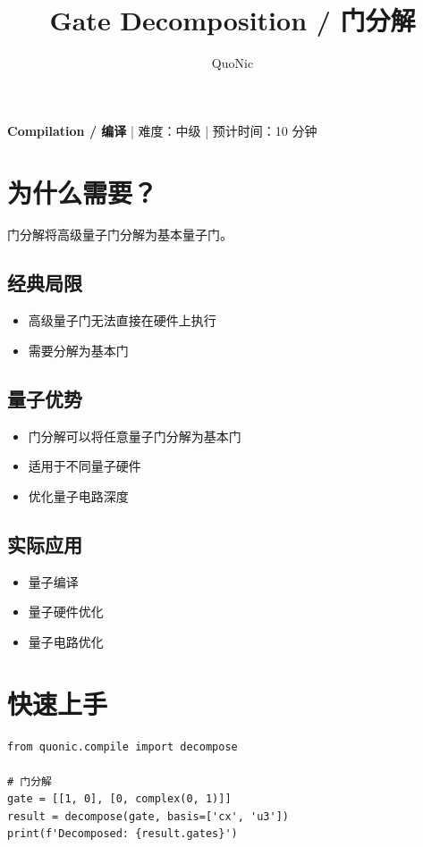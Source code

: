 \documentclass[12pt,a4paper]{article}
\title{Gate Decomposition / 门分解}
\author{QuoNic}
\date{}
\begin{document}
\maketitle

\begin{center}
\textbf{Compilation / 编译} | 难度：中级 | 预计时间：10 分钟
\end{center}

\tableofcontents
\newpage

\section{为什么需要？}

门分解将高级量子门分解为基本量子门。

\subsection{经典局限}
\begin{itemize}
  \item 高级量子门无法直接在硬件上执行
  \item 需要分解为基本门
\end{itemize}

\subsection{量子优势}
\begin{itemize}
  \item 门分解可以将任意量子门分解为基本门
  \item 适用于不同量子硬件
  \item 优化量子电路深度
\end{itemize}

\subsection{实际应用}
\begin{itemize}
  \item 量子编译
  \item 量子硬件优化
  \item 量子电路优化
\end{itemize}

\section{快速上手}

\begin{verbatim}
from quonic.compile import decompose

# 门分解
gate = [[1, 0], [0, complex(0, 1)]]
result = decompose(gate, basis=['cx', 'u3'])
print(f'Decomposed: {result.gates}')
\end{verbatim}
\end{document}
